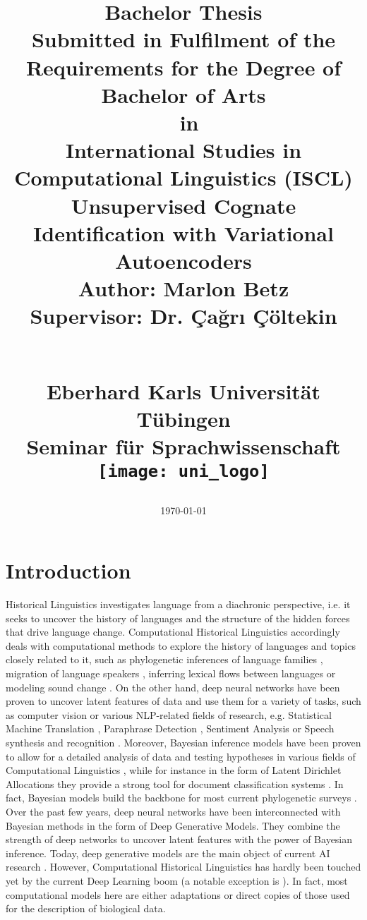 \documentclass[6pt]{article}
\title{
	{Bachelor Thesis}\\
	{\normalsize Submitted in Fulfilment of the Requirements for the Degree of} \\ %
{\large Bachelor of Arts} \\ %
	 {\small in} \\  %
	 {\large  International Studies in Computational Linguistics (ISCL) } \\ \vspace*{1cm} \hline \vspace*{1cm} 
	{\Huge \textbf{Unsupervised Cognate Identification with Variational Autoencoders}}\\ \vspace*{1cm} \hline \vspace*{1cm}
	{\LARGE  Author: Marlon Betz }  \\
	{\LARGE  Supervisor: Dr. Çağrı Çöltekin }  \\
\date{\today} \\
\vspace*{2cm}
	{\Large Eberhard Karls Universität Tübingen}\\
	{\large Seminar für Sprachwissenschaft} \\
	\vspace*{1cm}
	{\texttt{[image: uni\_logo]}}
}
\begin{document}
\thispagestyle{empty}
\maketitle
\thispagestyle{empty}
\newpage
\tableofcontents
\thispagestyle{empty}
\newpage
{}
\setcounter{page}{1}

\section{Introduction}

Historical Linguistics investigates language from a diachronic perspective, i.e. it seeks to uncover the history of languages and the structure of the hidden forces that drive language change.  Computational Historical Linguistics accordingly deals with computational methods to explore the history of languages and topics closely related to it, such as phylogenetic inferences of language families \citep{bouckaert2012mapping}, migration of language speakers \citep{gray2009language}, inferring lexical flows between languages \citep{dellert2015uralic} or modeling sound change \citep{bouchard2013automated}.  
On the other hand, deep neural networks have been proven to uncover latent features of data and use them for a variety of tasks, such as computer vision or various NLP-related fields of research, e.g. Statistical Machine Translation \citep{zhang2014bilingually,lauly2014autoencoder}, Paraphrase Detection \citep{socher2011dynamic}, Sentiment Analysis \citep{socher2013recursive} or Speech synthesis  and recognition \citep{hinton2012deep,zen2014deep}. 
Moreover, Bayesian inference models have been proven to allow for a detailed analysis of data and testing hypotheses in various fields of Computational Linguistics \citep{crocker2010computational,chater2006probabilistic}, while for instance in the form of Latent Dirichlet Allocations they provide a strong tool for document classification systems \citep{blei2003latent}. In fact, Bayesian models build the backbone for most current phylogenetic surveys \citep{gray2009language,bouckaert2012mapping,bouchard2013automated}.
Over the past few years, deep neural networks have been interconnected with Bayesian methods in the form of Deep Generative Models. They combine the strength of deep networks to uncover latent features with the power of Bayesian inference. Today, deep generative models are the main object of current AI research \citep[p. 654]{Goodfellow-et-al-2016-Book}. 
 However, Computational Historical Linguistics has hardly been touched yet by the current Deep Learning boom (a notable exception is \cite{rama2016siamese}). 
 In fact, most computational models here are either adaptations or direct copies of those used for the description of biological data. 
\end{document}
